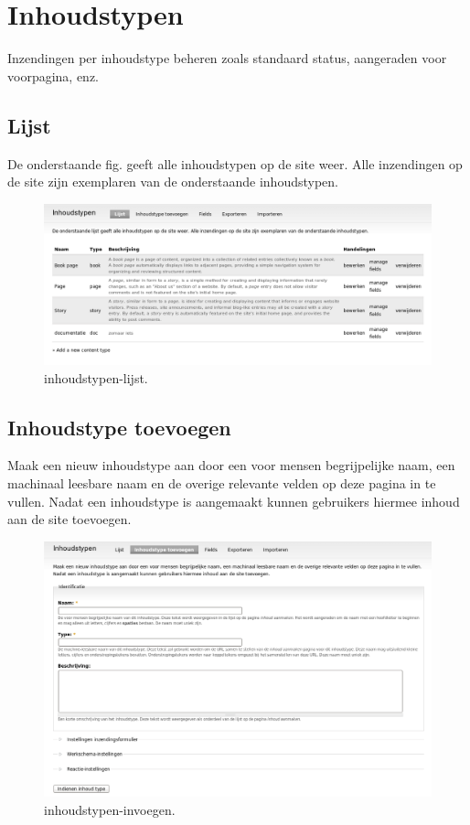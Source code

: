 \section{Inhoudstypen}
Inzendingen per inhoudstype beheren zoals standaard status, aangeraden voor
voorpagina, enz.
\subsection{Lijst}
De onderstaande fig. geeft alle inhoudstypen op de site weer. Alle inzendingen
op de site zijn exemplaren van de onderstaande inhoudstypen.
 \begin{figure}[!h]
    \centering
   \includegraphics[scale=0.3,angle=0]{inhoudstypen-lijst}
   \caption{inhoudstypen-lijst.\label{white}}
 \end{figure}

\subsection{Inhoudstype toevoegen}
Maak een nieuw inhoudstype aan door een voor mensen begrijpelijke naam, een
machinaal leesbare naam en de overige relevante velden op deze pagina in te vullen.
Nadat een inhoudstype is aangemaakt kunnen gebruikers hiermee inhoud aan de site toevoegen.
\begin{figure}[!h]
    \centering
   \includegraphics[scale=0.3,angle=0]{inhoudstypen-invoegen}
   \caption{inhoudstypen-invoegen.\label{white}}
 \end{figure}

